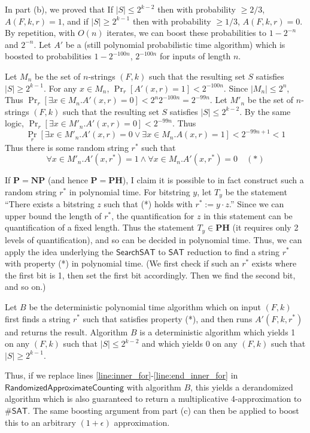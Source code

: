 \documentclass{article}
\renewcommand{\P}{\mathbf{P}}
\newcommand{\NP}{\mathbf{NP}}
\newcommand{\PH}{\mathbf{PH}}
\begin{document}
In part (b), we proved that If $|S| \leq 2^{k-2}$ then with probability $\geq 2/3$, $A(F, k, r) = 1$, and if $|S| \geq 2^{k-1}$ then with probability $\geq 1/3$, $A(F, k, r) = 0$.
By repetition, with $O(n)$ iterates, we can boost these probabilities to $1 - 2^{-n}$ and $2^{-n}$.
Let $A'$ be a (still polynomial probabilistic time algorithm) which is boosted to probabilities $1 - 2^{-100n}$, $2^{-100n}$ for inputs of length $n$.

Let $M_n$ be the set of $n$-strings $(F, k)$ such that the resulting set $S$ satisfies $|S| \geq 2^{k-1}$.
For any $x \in M_n$, $\Pr_r[A'(x, r) = 1] < 2^{-100n}$.
Since $|M_n| \leq 2^n$,
Thus $\Pr_r[\exists x \in M_n . A'(x, r) = 0] < 2^n 2^{-100n} = 2^{-99n}$.
Let $M'_n$ be the set of $n$-strings $(F, k)$ such that the resulting set $S$ satisfies $|S| \leq 2^{k-2}$.
By the same logic, $\Pr_r[\exists x \in M'_n . A'(x, r) = 0] < 2^{-99n}$.
Thus
$$
\Pr_r[\exists x \in M'_n . A'(x, r) = 0 \vee \exists x \in M_n . A(x, r) = 1] < 2^{-99n + 1} < 1
$$
Thus there is some random string $r^*$ such that
$$
\forall  x \in M'_n . A'(x, r^*) = 1 \wedge \forall x \in M_n . A'(x, r^*) = 0 \quad (*)
$$

If $\P = \NP$ (and hence $\P = \PH$), I claim it is possible to in fact construct such a random string $r^*$ in polynomial time.
For bitstring $y$, let $T_y$ be the statement ``There exists a bitstring $z$ such that (*) holds with $r^* := y \cdot z$.''
Since we can upper bound the length of $r^*$, the quantification for $z$ in this statement can be quantification of a fixed length.
Thus the statement $T_y \in \PH$ (it requires only 2 levels of quantification),
and so can be decided in polynomial time.
Thus, we can apply the idea underlying the $\mathsf{SearchSAT}$ to $\mathsf{SAT}$ reduction to find a string $r^*$ with property (*) in polynomial time.
(We first check if such an $r^*$ exists where the first bit is 1, then set the first bit accordingly.  Then we find the second bit, and so on.)

Let $B$ be the deterministic polynomial time algorithm which on input $(F, k)$ first finds a string $r^*$ such that satisfies property (*), and then runs $A'(F, k, r^*)$ and returns the result.
Algorithm $B$ is a deterministic algorithm which yields 1 on any $(F, k)$ such that $|S| \leq 2^{k-2}$ and which yields 0 on any $(F, k)$ such that $|S| \geq 2^{k-1}$.

Thus, if we replace lines \ref{line:inner_for}-\ref{line:end_inner_for} in $\mathsf{RandomizedApproximateCounting}$ with algorithm $B$, this yields a derandomized algorithm which is also guaranteed to return a multiplicative 4-approximation to $\#\mathsf{SAT}$.
The same boosting argument from part (c) can then be applied to boost this to an arbitrary $(1 + \epsilon)$ approximation.
\end{document}

